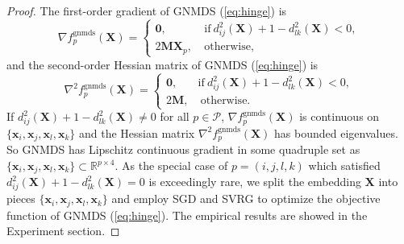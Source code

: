 \documentclass[./sbb_ordinal_embedding_aaai18.tex]{subfiles}%
\begin{document}
\begin{proof}
		The first-order gradient of GNMDS (\ref{eq:hinge}) is
		\begin{equation}
		\nabla f^{\text{gnmds}}_p(\mathbf{X})=
		\left\{\begin{array}{cl}
		\mathbf{0}, &\ \text{if}\ d^2_{ij}(\mathbf{X})+1-d^2_{lk}(\mathbf{X})<0,\\
		2\mathbf{MX}_p, &\ \text{otherwise},
		\end{array}\right.
		\end{equation}
		and the second-order Hessian matrix of GNMDS (\ref{eq:hinge}) is
		\begin{equation}
		\nabla^2 f^{\text{gnmds}}_p(\mathbf{X})=
		\left\{\begin{array}{cl}
		\mathbf{0}, & \text{if}\ d^2_{ij}(\mathbf{X})+1-d^2_{lk}(\mathbf{X})<0,\\
		2\mathbf{M}, &\ \text{otherwise}.
		\end{array}\right.
		\end{equation}
		If $d^2_{ij}(\mathbf{X})+1-d^2_{lk}(\mathbf{X})\neq 0$ for all $p\in\mathcal{P}$, $\nabla f^{\text{gnmds}}_p(\mathbf{X})$ is continuous on $\{\mathbf{x}_i, \mathbf{x}_j, \mathbf{x}_l, \mathbf{x}_k\}$ and the Hessian matrix $\nabla^2 f^{\text{gnmds}}_p(\mathbf{X})$ has bounded eigenvalues. So GNMDS has Lipschitz continuous gradient in some quadruple set as $\{\mathbf{x}_i, \mathbf{x}_j, \mathbf{x}_l, \mathbf{x}_k\}\subset\mathbb{R}^{p \times 4}$. As the special case of $p=(i,j,l,k)$ which satisfied $d^2_{ij}(\mathbf{X})+1-d^2_{lk}(\mathbf{X})=0$ is exceedingly rare, we split the embedding $\mathbf{X}$ into pieces $\{\mathbf{x}_i, \mathbf{x}_j, \mathbf{x}_l, \mathbf{x}_k\}$ and employ SGD and SVRG to optimize the objective function of GNMDS (\ref{eq:hinge}). The empirical results are showed in the Experiment section.
		

\end{proof}
\end{document}
